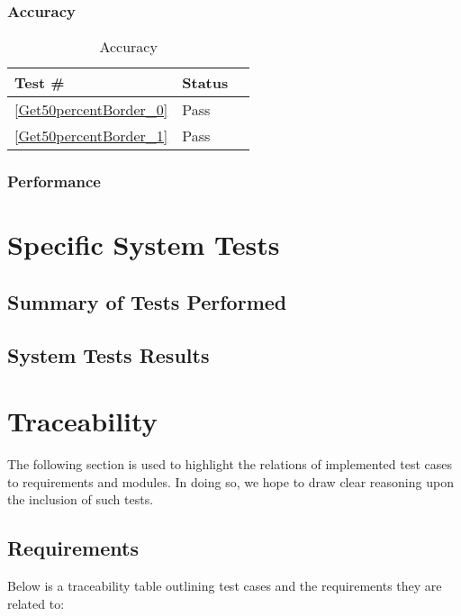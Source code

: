 \documentclass[12pt]{article}
\begin{document}
	\subsubsection{Accuracy}
		\begin{table}[H]
		\centering
		\caption{Accuracy}\label{Get50percentBorder_acc}
		\begin{tabular}{lll}
		\toprule
		\bf Test \# & Status \\\midrule		
		\ref{Get50percentBorder_0} & Pass\\
		\ref{Get50percentBorder_1} & Pass\\
		\bottomrule
		\end{tabular}
		\end{table}
	\subsubsection{Performance}

\section{Specific System Tests}
\subsection{Summary of Tests Performed}
\subsection{System Tests Results}

\section{Traceability}
The following section is used to highlight the relations of implemented test cases to requirements and modules. In doing so, we hope to draw clear reasoning upon the inclusion of such tests. 
\subsection{Requirements}
Below is a traceability table outlining test cases and the requirements they are related to:\\
\end{document}
